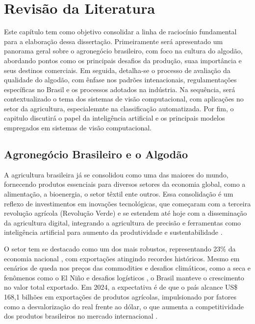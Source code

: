 

\chapter{Revisão da Literatura}\label{rev_literatura}

Este capítulo tem como objetivo consolidar a linha de raciocínio fundamental para a elaboração dessa dissertação. Primeiramente
será apresentado um panorama geral sobre o agronegócio brasileiro, com foco na cultura do algodão, abordando pontos como os principais desafios da produção, 
suaa importância e seus destinos comerciais. Em seguida, detalha-se o processo de avaliação da qualidade do algodão, com ênfase nos padrões intenacionais,
regulamentações específicas no Brasil e os processos adotados na indústria. Na sequência, será contextualizado o tema dos sistemas de visão computacional,
com aplicações no setor da agricultura, especialemnte na classificação automatizada. Por fim, o capitulo discutirá o papel da inteligência artificial e 
os principais modelos empregados em sistemas de visão computacional.

\section{Agronegócio Brasileiro e o Algodão}\label{rev_agro_algodao}

A agricultura brasileira já se consolidou como uma das maiores do mundo, fornecendo produtos essenciais para diversos setores da economia 
global, como a alimentação, a bioenergia, o setor têxtil ente outros. Essa consolidação é um reflexo de investimentos em inovações tecnológicas, que começaram 
com a terceira revolução agrícola (Revolução Verde) e se estendem até hoje com a disseminação da agricultura digital, integrando a 
agricultura de precisão e ferramentas como inteligência artificial para aumento da produtividade e sustentabilidade \cite{abbade2014agro, basso2024agriculture}.

O setor tem se destacado como um dos mais robustos, representando 23\% da economia nacional \cite{filho2024pib}, com exportações atingindo recordes históricos. 
Mesmo em cenários de queda nos preços das commodities e desafios climáticos, como a seca e fenômenos como o El Niño \cite{lin2019elnino} e desafios logísticos \cite{goncalves2024logistica}, 
o Brasil manteve o crescimento no valor total exportado. Em 2024, a expectativa é de que o país alcance US\$ 168,1 bilhões em exportações de produtos 
agrícolas, impulsionado por fatores como a desvalorização do real frente ao dólar, o que aumenta a competitividade dos produtos
 brasileiros no mercado internacional \cite{cardoso2024perspectivas}.

